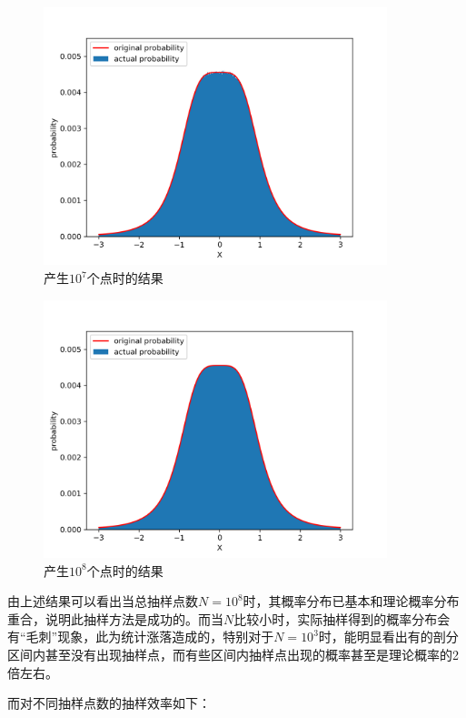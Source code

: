 \documentclass[a4paper,11pt]{article}
\begin{document}
\begin{figure}[!htbp]        
\centering
\includegraphics[width=10cm]{107.png}      
\caption{ 产生$10^{7}$个点时的结果}      
\end{figure}

\begin{figure}[!htbp]        
\centering
\includegraphics[width=10cm]{108.png}      
\caption{ 产生$10^{8}$个点时的结果}      
\end{figure}



\newpage
 由上述结果可以看出当总抽样点数$N=10^{8}$时，其概率分布已基本和理论概率分布重合，说明此抽样方法是成功的。而当$N$比较小时，实际抽样得到的概率分布会有“毛刺”现象，此为统计涨落造成的，特别对于$N=10^{3}$时，能明显看出有的剖分区间内甚至没有出现抽样点，而有些区间内抽样点出现的概率甚至是理论概率的2倍左右。
 
 而对不同抽样点数的抽样效率如下：

\begin{table}[!htbp]
\centering
{}
\caption{抽样效率一览表}
\end{table}
\end{document}
